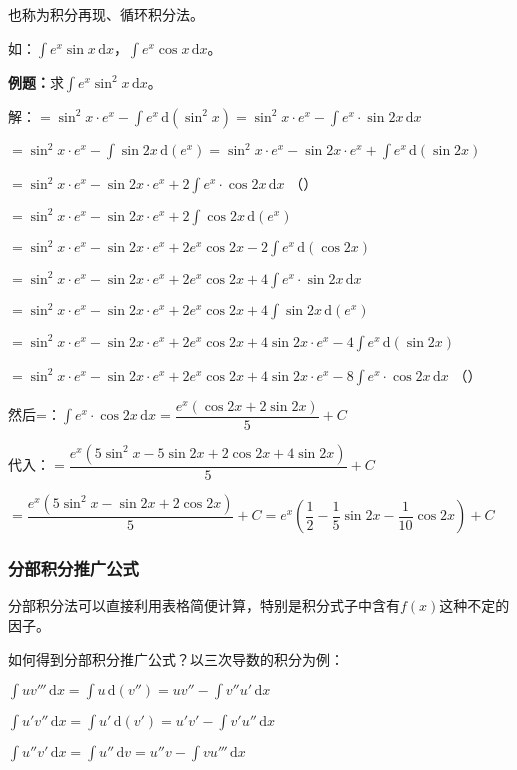 \documentclass[UTF8, 12pt]{ctexart}
\begin{document}
也称为积分再现、循环积分法。

如：$\int e^x\sin x\,\textrm{d}x$，$\int e^x\cos x\,\textrm{d}x$。

\textbf{例题：}求$\int e^x\sin^2x\,\textrm{d}x$。

解：$=\sin^2x\cdot e^x-\int e^x\,\textrm{d}(\sin^2x)=\sin^2x\cdot e^x-\int e^x\cdot\sin 2x\,\textrm{d}x$

$=\sin^2x\cdot e^x-\int\sin2x\,\textrm{d}(e^x)=\sin^2x\cdot e^x-\sin2x\cdot e^x+\int e^x\,\textrm{d}(\sin2x)$

$=\sin^2x\cdot e^x-\sin2x\cdot e^x+2\int e^x\cdot\cos2x\,\textrm{d}x$ （）

$=\sin^2x\cdot e^x-\sin2x\cdot e^x+2\int\cos2x\,\textrm{d}(e^x)$

$=\sin^2x\cdot e^x-\sin2x\cdot e^x+2e^x\cos2x-2\int e^x\,\textrm{d}(\cos2x)$

$=\sin^2x\cdot e^x-\sin2x\cdot e^x+2e^x\cos2x+4\int e^x\cdot\sin2x\,\textrm{d}x$

$=\sin^2x\cdot e^x-\sin2x\cdot e^x+2e^x\cos2x+4\int\sin2x\,\textrm{d}(e^x)$

$=\sin^2x\cdot e^x-\sin2x\cdot e^x+2e^x\cos2x+4\sin2x\cdot e^x-4\int e^x\,\textrm{d}(\sin2x)$

$=\sin^2x\cdot e^x-\sin2x\cdot e^x+2e^x\cos2x+4\sin2x\cdot e^x-8\int e^x\cdot\cos2x\,\textrm{d}x$ （）

然后=：$\int e^x\cdot\cos2x\,\textrm{d}x=\dfrac{e^x(\cos2x+2\sin2x)}{5}+C$

代入：$=\dfrac{e^x(5\sin^2x-5\sin2x+2\cos2x+4\sin2x)}{5}+C$

$=\dfrac{e^x(5\sin^2x-\sin2x+2\cos2x)}{5}+C=e^x\left(\dfrac{1}{2}-\dfrac{1}{5}\sin2x-\dfrac{1}{10}\cos2x\right)+C$

\subsubsection{分部积分推广公式}

分部积分法可以直接利用表格简便计算，特别是积分式子中含有$f(x)$这种不定的因子。

如何得到分部积分推广公式？以三次导数的积分为例：

$\int uv'''\,\textrm{d}x=\int u\,\textrm{d}(v'')=uv''-\int v''u'\,\textrm{d}x$

$\int u'v''\,\textrm{d}x=\int u'\,\textrm{d}(v')=u'v'-\int v'u''\,\textrm{d}x$

$\int u''v'\,\textrm{d}x=\int u''\,\textrm{d}v=u''v-\int vu'''\,\textrm{d}x$
\end{document}
